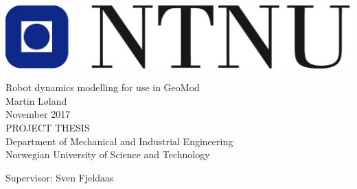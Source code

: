 
\thispagestyle{empty}
\includegraphics[scale=0.6]{img/ntnu}
\mbox{}\\[6pc]
\begin{center}
\Huge{Robot dynamics modelling for use in GeoMod}\\[2pc]

\Large{Martin Løland}\\[1pc]
\large{November 2017}\\[2pc]

PROJECT THESIS\\
Department of Mechanical and Industrial Engineering\\
Norwegian University of Science and Technology
\end{center}
\vfill

\noindent Supervisor: Sven Fjeldaas
